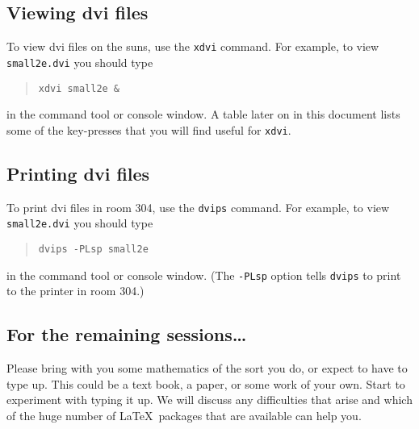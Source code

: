 \documentclass[a4paper,12pt]{article}
\begin{document}
\subsection*{Viewing dvi files}

To view dvi files on the suns, use the \texttt{xdvi} command.
For example, to view \texttt{small2e.dvi} you should type
\begin{quote}
\texttt{xdvi small2e \&}
\end{quote}
in the command tool or console window.  A table later on in this document
lists some of the key-presses that you will find useful for \texttt{xdvi}.

\subsection*{Printing dvi files}

To print dvi files in room 304, use the \texttt{dvips} command.
For example, to view \texttt{small2e.dvi} you should type
\begin{quote}
\texttt{dvips -PLsp small2e}
\end{quote}
in the command tool or console window.  (The \texttt{-PLsp}
option tells \texttt{dvips} to print to the printer in room 304.)

\subsection*{For the remaining sessions\ldots}  
Please bring with you some mathematics of
the sort you do, or expect to have to type up.  This could be a text book,
a paper, or some work of your own.  Start to experiment with typing it
up.  We will discuss any difficulties that arise and which of the huge
number of \LaTeX\ packages that are available can help you.
\end{document}
